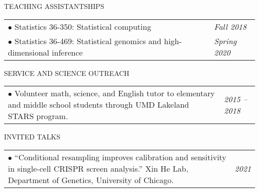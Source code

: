 \documentclass{resume} %
\begin{document}
\begin{rSection}{TEACHING ASSISTANTSHIPS}
\begin{tabular}{p{14cm}R{2.5cm}}
	$\bullet$ Statistics 36-350: Statistical computing 
	& \textit{Fall 2018} \\ 
	$\bullet$ Statistics 36-469: Statistical genomics and high-dimensional inference & \textit{Spring 2020}
\end{tabular} 
\end{rSection}

\begin{rSection}{SERVICE AND SCIENCE OUTREACH}
	\begin{tabular}{p{14cm}R{2.5cm}}
		$\bullet$ Volunteer math, science, and English tutor to elementary and middle school students through UMD Lakeland STARS program. & \it{2015 -- 2018}  \\ 
	\end{tabular} 
\end{rSection}

\begin{rSection}{INVITED TALKS}
	\begin{tabular}{p{14cm}R{2.5cm}}
		$\bullet$ ``Conditional resampling improves calibration and sensitivity in single-cell CRISPR screen analysis.'' Xin He Lab, Department of Genetics, University of Chicago.& \it{2021}
	\end{tabular}
	
\end{rSection}
\end{document}

